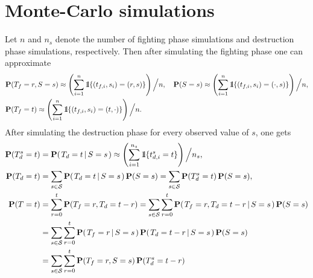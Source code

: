 \documentclass{article}
\newcommand{\prob}[1]{\mathbf{#1}}
\newcommand{\cond}[2]{\left. {#1} \, \middle | \, {#2} \right.}
\newcommand{\One}{\mathchoice{\rm 1\mskip-4.2mu l}{\rm 1\mskip-4.2mu l}{\rm 1\mskip-4.6mu l}{\rm 1\mskip-5.2mu l}}
\numberwithin{equation}{section}
\begin{document}
\section{Monte-Carlo simulations}

Let $n$ and $n_s$ denote the number of fighting phase simulations and destruction phase simulations, respectively. Then after simulating the fighting phase one can approximate
\begin{align}
    &\prob{P} (T_f = r, S = s) \approx \left( \sum _{i = 1} ^n \One \{ (t_{f, i}, s_i) = (r, s) \} \right) \Big\slash n, \quad
    \prob{P} (S = s) \approx \left( \sum _{i = 1} ^n \One \{ (t_{f, i}, s_i) = (\cdot , s) \} \right) \Big\slash n, \nonumber \\
    &\prob{P} (T_f = t) \approx \left( \sum _{i = 1} ^n \One \{ (t_{f, i}, s_i) = (t, \cdot ) \} \right) \Big\slash n. \label{eq:rounds_fight}
\end{align}
After simulating the destruction phase for every observed value of $s$, one gets
\begin{align}
    \prob{P} (T_d^s = t) &= \prob{P} (\cond{T_d = t}{S = s}) \approx \left( \sum _{i = 1} ^{n_s} \One \{ t_{d, i}^s = t \} \right) \Big\slash n_s, \nonumber \\
    \prob{P} (T_d = t) &= \sum _{s \in \mathcal{S}} \prob{P} (\cond{T_d = t}{S = s}) \, \prob{P} (S = s)
        = \sum _{s \in \mathcal{S}} \prob{P} (T_d^s = t) \, \prob{P} (S = s), \label{eq:rounds_destruct} \\
    \prob{P} (T = t) &= \sum _{r = 0}^t \prob{P} (T_f = r, T_d = t - r)
        = \sum _{s \in \mathcal{S}} \sum _{r = 0}^t \prob{P} (\cond{T_f = r, T_d = t - r}{S = s}) \, \prob{P} (S = s) \nonumber \\
        &= \sum _{s \in \mathcal{S}} \sum _{r = 0}^t \prob{P} (\cond{T_f = r}{S = s}) \, \prob{P} (\cond{T_d = t - r}{S = s}) \, \prob{P} (S = s) \nonumber \\
        &= \sum _{s \in \mathcal{S}} \sum _{r = 0}^t \prob{P} (T_f = r, S = s) \, \prob{P} (T_d^s = t - r) \label{eq:rounds_time}
\end{align}

\end{document}
